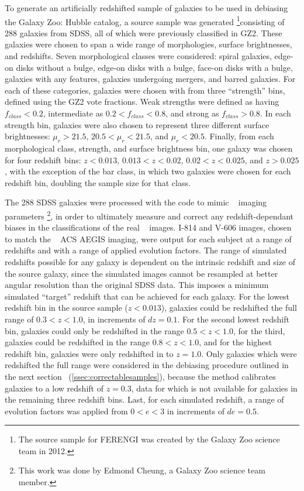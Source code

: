 To generate an artificially redshifted sample of galaxies to be used in debiasing the Galaxy Zoo: Hubble catalog, a source sample was generated \footnote{The source sample for FERENGI was created by the Galaxy Zoo science team in 2012.}consisting of 288 galaxies from SDSS, all of which were previously classified in GZ2. These galaxies were chosen to span a wide range of morphologies, surface brightnesses, and redshifts. Seven morphological classes were considered: spiral galaxies, edge-on disks without a bulge, edge-on disks with a bulge, face-on disks with a bulge, galaxies with any features, galaxies undergoing mergers, and barred galaxies. For each of these categories, galaxies were chosen with from three ``strength'' bins, defined using the GZ2 vote fractions. Weak strengths were defined as having $f_{class}<0.2$, intermediate as $0.2<f_{class}<0.8$, and strong as $f_{class}>0.8$. In each strength bin, galaxies were also chosen to represent three different surface brightnesses: $\mu_{r}>21.5$, $20.5<\mu_{r}<21.5$, and $\mu_{r}<20.5$. Finally, from each morphological class, strength, and surface brightness bin, one galaxy was chosen for four redshift bins: $z<0.013$, $0.013<z<0.02$, $0.02<z<0.025$, and $z>0.025$, with the exception of the bar class, in which two galaxies were chosen for each redshift bin, doubling the sample size for that class.


The 288 SDSS galaxies were processed with the \ferengi{} code to mimic \hst~ imaging parameters \footnote{This work was done by Edmond Cheung, a Galaxy Zoo science team member.}, in order to ultimately measure and correct any redshift-dependant biases in the classifications of the real \hst~ images. I-814 and V-606 images, chosen to match the \hst~ ACS AEGIS imaging, were output for each subject at a range of redshifts and with a range of applied evolution factors. The range of simulated redshifts possible for any galaxy is dependent on the intrinsic redshift and size of the source galaxy, since the simulated images cannot be resampled at better angular resolution than the original SDSS data. This imposes a minimum simulated ``target'' redshift that can be achieved for each galaxy. For the lowest redshift bin in the source sample ($z<0.013$), galaxies could be redshifted the full range of $0.3<z<1.0$, in increments of $dz=0.1$. For the second lowest redshift bin, galaxies could only be redshifted in the range $0.5<z<1.0$, for the third, galaxies could be redshifted in the range $0.8<z<1.0$, and for the highest redshift bin, galaxies were only redshifted in \ferengi{} to $z=1.0$. Only galaxies which were redshifted the full range were considered in the debiasing procedure outlined in the next section~ (\ref{ssec:correctablesamples}), because the method calibrates galaxies to a low redshift of $z=0.3$, data for which is not available for galaxies in the remaining three redshift bins. Last, for each simulated redshift, a range of evolution factors was applied from $0<e<3$ in increments of $de=0.5$. 

